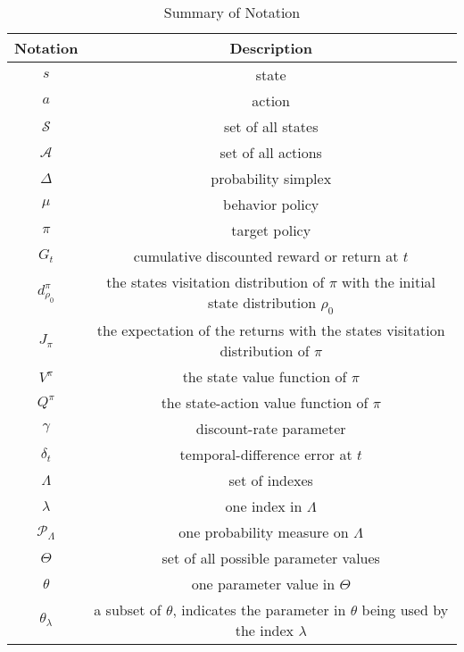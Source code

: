 \documentclass[nohyperref]{article}
\theoremstyle{plain}
\begin{document}
\begin{table}[!hb]
	\centering
	\caption{Summary of Notation}
	\label{tab: notation}
	\begin{tabular}{|c |c| }
	    \hline
		\textbf{Notation} &\textbf{Description}\\
		\hline
	    $s$ & state \\
	    \hline
	    $a$ & action \\
	    \hline
	    $\mathcal{S} $ & set of all states \\
	    \hline
	    $\mathcal{A} $ & set of all actions \\
	    \hline
	    $\Delta$  & probability simplex \\
	    \hline
	    $\mu $ & behavior policy \\
	    \hline
	    $\pi $ & target policy \\
	    \hline
	    $G_t $ & \makecell[c]{cumulative discounted reward \\ or return at $t$} \\
	    \hline
	    $d_{\rho_0}^{\pi}$  & \makecell[c]{the states visitation distribution of $\pi$ \\ with the initial state distribution 
	    $\rho_0$} \\
	    \hline
	    $J_{\pi}$     & \makecell[c]{the expectation of the returns \\ with the states visitation distribution of $\pi$} \\
	    \hline
	    $V^{\pi}$ & the state value function of $\pi$\\
	    \hline
	    $Q^{\pi}$ &  the state-action value function of $\pi$\\
	    \hline
	    $\gamma$ & discount-rate parameter \\
	    \hline
	    $\delta_{t}$ & temporal-difference error at $t$\\
	    \hline
	    $\Lambda$ & set of indexes  \\
	    \hline
	    $\lambda$ & one index in $\Lambda$ \\
	    \hline
	    $\mathcal{P}_{\Lambda}$ & one probability measure on $\Lambda$ \\
	    \hline
	    $\Theta$  & set of all possible parameter values \\
	    \hline
	    $\theta$  & one parameter value in $\Theta$ \\
	    \hline
	    $\theta_\lambda$ & \makecell[c]{a subset of $\theta$, indicates \\ the parameter in $\theta$ being used by the index $\lambda$} \\

\end{tabular}
\end{table}
\end{document}
